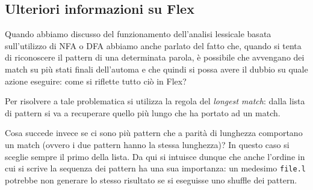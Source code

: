 \documentclass[class=book, crop=false, oneside, 12pt]{standalone}
\begin{document}
\subsection{Ulteriori informazioni su Flex}
Quando abbiamo discusso del funzionamento dell'analisi lessicale basata sull'utilizzo di NFA o DFA abbiamo anche parlato del fatto che, quando si tenta di riconoscere il pattern di una determinata parola, è possibile che avvengano dei match su più stati finali dell'automa e che quindi si possa avere il dubbio su quale azione eseguire: come si riflette tutto ciò in Flex? 

Per risolvere a tale problematica si utilizza la regola del \emph{longest match}: dalla lista di pattern si va a recuperare quello più lungo che ha portato ad un match.

Cosa succede invece se ci sono più pattern che a parità di lunghezza comportano un match (ovvero i due pattern hanno la stessa lunghezza)? In questo caso si sceglie sempre il primo della lista. Da qui si intuisce dunque che anche l'ordine in cui si scrive la sequenza dei pattern ha una sua importanza: un medesimo \texttt{file.l} potrebbe non generare lo stesso risultato se si eseguisse uno shuffle dei pattern.
\end{document}
